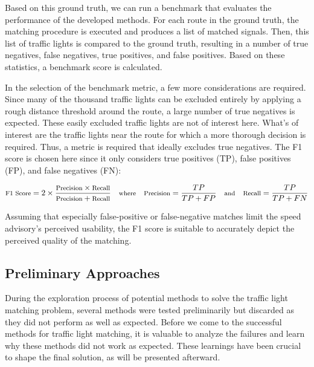 Based on this ground truth, we can run a benchmark that evaluates the performance of the developed methods. For each route in the ground truth, the matching procedure is executed and produces a list of matched signals. Then, this list of traffic lights is compared to the ground truth, resulting in a number of true negatives, false negatives, true positives, and false positives. Based on these statistics, a benchmark score is calculated.

In the selection of the benchmark metric, a few more considerations are required. Since many of the thousand traffic lights can be excluded entirely by applying a rough distance threshold around the route, a large number of true negatives is expected. These easily excluded traffic lights are not of interest here. What's of interest are the traffic lights near the route for which a more thorough decision is required. Thus, a metric is required that ideally excludes true negatives. The F1 score is chosen here since it only considers true positives (TP), false positives (FP), and false negatives (FN): 

\begin{equation}
\text{\footnotesize F1 Score} = 2 \times \frac{\text{\footnotesize Precision} \times \text{\footnotesize Recall}}{\text{\footnotesize Precision} + \text{\footnotesize Recall}} \quad \text{\footnotesize where} \quad \text{\footnotesize Precision} = \frac{TP}{TP + FP} \quad \text{\footnotesize and} \quad \text{\footnotesize Recall} = \frac{TP}{TP + FN}
\end{equation}

Assuming that especially false-positive or false-negative matches limit the speed advisory's perceived usability, the F1 score is suitable to accurately depict the perceived quality of the matching.

\subsection{Preliminary Approaches}

During the exploration process of potential methods to solve the traffic light matching problem, several methods were tested preliminarily but discarded as they did not perform as well as expected. Before we come to the successful methods for traffic light matching, it is valuable to analyze the failures and learn why these methods did not work as expected. These learnings have been crucial to shape the final solution, as will be presented afterward.

